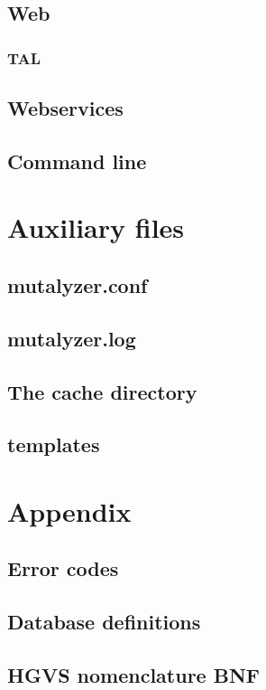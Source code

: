 \documentclass{article}
\begin{document}
\subsection{Web} \label{subsec:webinterface}

\subsubsection{TAL} \label{subsubsec:templates}

\subsection{Webservices} \label{subsec:webservinterface}

\subsection{Command line} \label{subsec:commandline}

\newpage

\section{Auxiliary files}

\subsection{mutalyzer.conf}

\subsection{mutalyzer.log}

\subsection{The cache directory}

\subsection{templates}

\newpage

\appendix

\section{Appendix}

\subsection{Error codes} \label{subsec:error}


\subsection{Database definitions} \label{subsec:dbtables}


\subsection{HGVS nomenclature BNF} \label{subsec:bnf}


\newpage

{}

\end{document}
